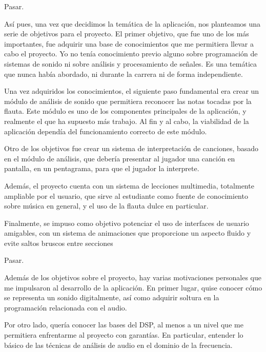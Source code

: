 \documentclass[landscape]{article}
\newenvironment{nota}
{%
\begin{framed} \noindent\itshape
}
{%
\end{framed}\vspace{-0.5cm} }
\begin{document}
\begin{multicols*}{2}
\begin{nota}
  Pasar.
\end{nota}

Así pues, una vez que decidimos la temática de la aplicación, nos planteamos una
serie de objetivos para el proyecto. El primer objetivo, que fue uno de los más
importantes, fue adquirir una base de conocimientos que me permitiera llevar a
cabo el proyecto. Yo no tenía conocimiento previo alguno sobre programación de
sistemas de sonido ni sobre análisis y procesamiento de señales. Es una temática
que nunca había abordado, ni durante la carrera ni de forma independiente.

Una vez adquiridos los conocimientos,  el siguiente paso
fundamental era crear un módulo de análisis de sonido que permitiera reconocer
las notas tocadas por la flauta. Este módulo es uno de los componentes
principales de la aplicación, y realmente el que ha supuesto más trabajo. Al fin
y al cabo, la viabilidad de la aplicación dependía del funcionamiento correcto
de este módulo. 

 Otro de los objetivos fue crear un sistema de interpretación de
canciones, basado en el módulo de análisis, que debería presentar al jugador una
canción en pantalla, en un pentagrama, para que el jugador la interprete.

 Además, el proyecto cuenta con un sistema de lecciones multimedia, totalmente
ampliable por el usuario, que sirve al estudiante como fuente de conocimiento
sobre música en general, y el uso de la flauta dulce en particular.

 Finalmente, se impuso como objetivo potenciar el uso de interfaces de usuario
amigables, con un sistema de animaciones que proporcione un aspecto fluido y
evite saltos bruscos entre secciones

\begin{nota}
  Pasar.
\end{nota}

Además de los objetivos sobre el proyecto, hay varias motivaciones personales
que me impulsaron al desarrollo de la aplicación. En primer lugar, quise conocer
cómo se representa un sonido digitalmente, así como adquirir soltura en la
programación relacionada con el audio.

 Por otro lado, quería conocer las bases del DSP, al menos a un
nivel que me permitiera enfrentarme al proyecto con garantías. En particular,
entender lo básico de las técnicas de análisis de audio en el dominio de la
frecuencia.


\end{multicols*}
\end{document}
